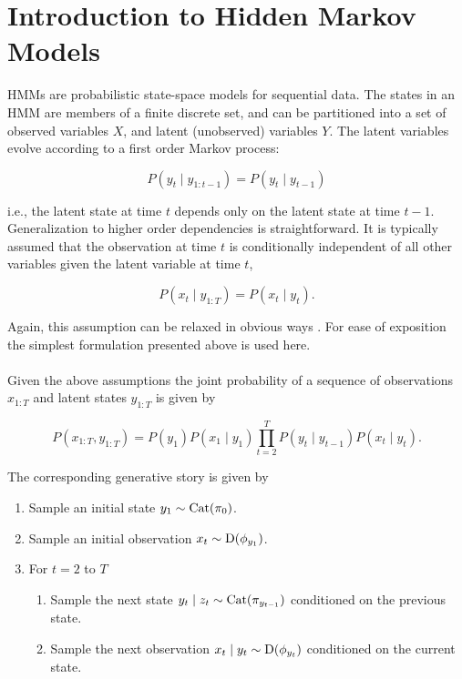 \documentclass[12pt]{report}
\newcommand{\1}[0]{\mathbbm{1}}
\newcommand{\Cat}[0]{\textnormal{Cat}}
\newcommand{\SomeDist}[0]{\textnormal{D}}
\newcommand{\seq}[3]{\ensuremath{#1_{{#2}:{#3}}}}
\begin{document}
\section{Introduction to Hidden Markov Models}\label{sec:hmm-intro}
\acp{HMM} are probabilistic state-space models for sequential data.
The states in an \ac{HMM} are members of a finite discrete set, and 
can be partitioned into a set of observed variables $X$, and latent 
(unobserved) variables $Y$. The latent variables evolve according to
a first order Markov process:

\[
    P(y_t \mid \seq{y}{1}{t-1}) = P(y_t \mid y_{t-1})
\]

i.e., the latent state at time $t$ depends only on the latent state 
at time $t-1$. Generalization to higher order dependencies is straightforward.
It is typically assumed that the observation at time $t$ is conditionally 
independent of all other variables given the latent variable at time $t$, 

\[
    P(x_t \mid \seq{y}{1}{T}) = P(x_t \mid y_t).
\]

Again, this assumption can be relaxed in obvious ways \cite{autoregressive-shannon}.
For ease of exposition the simplest formulation presented above is used here.
\\\\
Given the above assumptions the joint probability of a sequence of observations 
$\seq{x}{1}{T}$ and latent states $\seq{y}{1}{T}$ is given by

\begin{equation}\label{eq:hmm-joint}
    P(\seq{x}{1}{T}, \seq{y}{1}{T}) = 
    P(y_1)P(x_1 \mid y_1) \prod_{t=2}^T P(y_t \mid y_{t-1}) P(x_t \mid y_t).
\end{equation}

The corresponding generative story is given by

\begin{enumerate}
    \item Sample an initial state $y_1 \sim \Cat(\pi_0)$.
    \item Sample an initial observation $x_t \sim \SomeDist(\phi_{y_1})$.
    \item For $t = 2$ to $T$
    \begin{enumerate}
        \item Sample the next state $y_{t} \mid z_t \sim \Cat(\pi_{y_{t-1}})$ conditioned on the previous state.
        \item Sample the next observation $x_t \mid y_t \sim \SomeDist(\phi_{y_t})$ conditioned on the current state.
    \end{enumerate}
\end{enumerate}
\end{document}
